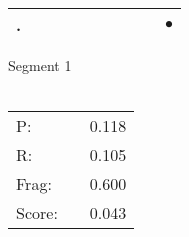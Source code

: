 \documentclass[landscape]{article}
\newcommand{\ssp}{\hspace{2pt}}
\newcommand{\mex}{\cellcolor{g}$\bullet$}
\begin{document}
\begin{tabular}{|l|p{10pt}|p{10pt}|p{10pt}|p{10pt}|p{10pt}|p{10pt}|p{10pt}|p{10pt}|p{10pt}|}
\hline
\ssp \cellcolor{ref8}. \ssp&\hspace{2pt}&\hspace{2pt}&\hspace{2pt}&\hspace{2pt}&\hspace{2pt}&\hspace{2pt}&\hspace{2pt}&\hspace{2pt}&\hspace{2pt}\mex\\
\hline
\end{tabular}

\vspace{6pt}
\noindent Segment 1\\\\
\noindent\begin{tabular}{lm{12pt}r}
\hline
P:&&0.118\\
R:&&0.105\\
Frag:&&0.600\\
Score:&&0.043\\
\end{tabular}

\newpage
\end{document}
